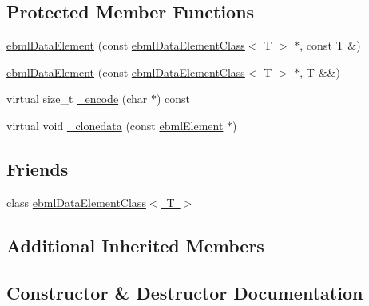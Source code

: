 \subsection*{Protected Member Functions}
\begin{DoxyCompactItemize}
\item 
\mbox{\hyperlink{classebml_1_1ebmlDataElement_a9b130669c4ed313918eb8af37f067b1d}{ebml\+Data\+Element}} (const \mbox{\hyperlink{classebml_1_1ebmlDataElementClass}{ebml\+Data\+Element\+Class}}$<$ T $>$ $\ast$, const T \&)
\item 
\mbox{\hyperlink{classebml_1_1ebmlDataElement_a6006b80fd6faec7d0cc46a597c7073dc}{ebml\+Data\+Element}} (const \mbox{\hyperlink{classebml_1_1ebmlDataElementClass}{ebml\+Data\+Element\+Class}}$<$ T $>$ $\ast$, T \&\&)
\item 
virtual size\+\_\+t \mbox{\hyperlink{classebml_1_1ebmlDataElement_aabb10c15457709e0aa2c1f5744ddbfff}{\+\_\+encode}} (char $\ast$) const
\item 
virtual void \mbox{\hyperlink{classebml_1_1ebmlDataElement_abc9e99cdc566a08b2334e55374dc5f5a}{\+\_\+clonedata}} (const \mbox{\hyperlink{classebml_1_1ebmlElement}{ebml\+Element}} $\ast$)
\end{DoxyCompactItemize}
\subsection*{Friends}
\begin{DoxyCompactItemize}
\item 
class \mbox{\hyperlink{classebml_1_1ebmlDataElement_ae0bbbe5e14590a39747036bca3911c95}{ebml\+Data\+Element\+Class$<$ T $>$}}
\end{DoxyCompactItemize}
\subsection*{Additional Inherited Members}


\subsection{Constructor \& Destructor Documentation}
\mbox{\label{classebml_1_1ebmlDataElement_a9b130669c4ed313918eb8af37f067b1d}} 
